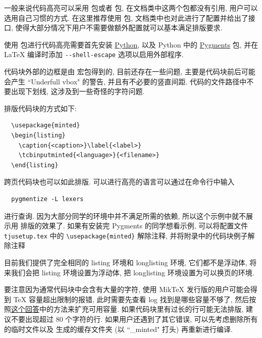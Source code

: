 一般来说代码高亮可以采用  包或者  包, 在文档类中这两个包都没有引用, 用户可以选用自己习惯的方式. 在这里推荐使用  包, 文档类中也对此进行了配置并给出了接口, 使得大部分情况下用户不需要做额外配置就可以基本满足排版要求.

使用  包进行代码高亮需要首先安装 \href{https://wiki.python.org/moin/BeginnersGuide/Download}{Python}, 以及 Python 中的 \href{https://pygments.org/download/}{Pygments} 包, 并在 {\LaTeX} 编译时添加 \verb|--shell-escape| 选项以启用外部程序.

代码块外部的边框是由  宏包得到的, 目前还存在一些问题, 主要是代码块前后可能会产生 ``Underfull vbox" 的警告, 并且有不必要的竖直间距. 代码的文件路径中不要出现下划线, 这涉及到一些奇怪的字符问题.

排版代码块的方式如下:
\begin{verbatim}
  \usepackage{minted}
  \begin{listing}
    \caption{<caption>}\label{<label>}
    \tcbinputminted{<language>}{<filename>}
  \end{listing}
\end{verbatim}
跨页代码块也可以如此排版. 可以进行高亮的语言可以通过在命令行中输入
\begin{verbatim}
  pygmentize -L lexers
\end{verbatim}
进行查询. 因为大部分同学的环境中并不满足所需的依赖, 所以这个示例中就不展示用  排版的效果了. 如果有安装完 Pygments 的同学想看示例, 可以将配置文件 \verb|tjusetup.tex| 中的 \verb|\usepackage{minted}| 解除注释, 并将附录中的代码块例子解除注释

目前我们提供了完全相同的 listing 环境和 longlisting 环境, 它们都不是浮动体, 将来我们会把 listing 环境设置为浮动体, 把 longlisting 环境设置为可以换页的环境.

要注意因为通常代码块中会含有大量的字符, 使用 MikTeX 发行版的用户可能会得到 TeX 容量超出限制的报错, 此时需要先查看 log 找到是哪些容量不够了, 然后按照\href{https://tex.stackexchange.com/a/548335/}{这个回答}中的方法来扩充可用容量. 如果代码块里有过长的行可能无法排版, 建议不要出现超过 80 个字符的行. 如果用户还遇到了其它错误, 可以先考虑删除所有的临时文件以及  生成的缓存文件夹 (以 ``\_minted" 打头) 再重新进行编译.


